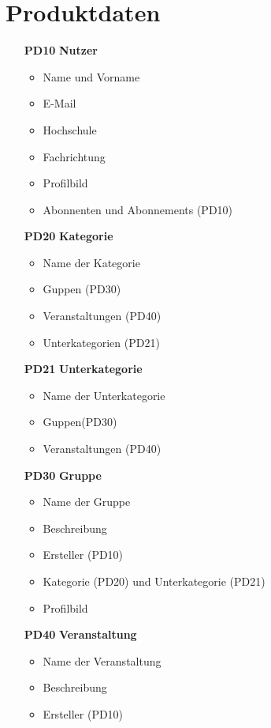 \documentclass[parskip=full]{scrartcl}
\begin{document}
	\section{Produktdaten}
	\begin{itemize}
		\item[\textbf{PD10}] \textbf{Nutzer}
			\begin{itemize}[nosep]
				\item Name und Vorname
				\item E-Mail
				\item Hochschule
				\item Fachrichtung
				\item Profilbild
				\item Abonnenten und Abonnements (PD10)
			\end{itemize}
		\item[\textbf{PD20}] \textbf{Kategorie}
			\begin{itemize}[nosep]
				\item Name der Kategorie
				\item Guppen (PD30)
				\item Veranstaltungen (PD40)
				\item Unterkategorien (PD21)
			\end{itemize}
		\item[\textbf{PD21}] \textbf{Unterkategorie}
			\begin{itemize}[nosep]
				\item Name der Unterkategorie
				\item Guppen(PD30)
				\item Veranstaltungen (PD40)
			\end{itemize}
		\item[\textbf{PD30}] \textbf{Gruppe}
			\begin{itemize}
				\item Name der Gruppe
				\item Beschreibung
				\item Ersteller (PD10)
				\item Kategorie (PD20) und Unterkategorie (PD21)
				\item Profilbild
			\end{itemize}
		\item[\textbf{PD40}] \textbf{Veranstaltung}
			\begin{itemize}[nosep]
				\item Name der Veranstaltung
				\item Beschreibung
				\item Ersteller (PD10)

\end{itemize}
\end{itemize}
\end{document}
